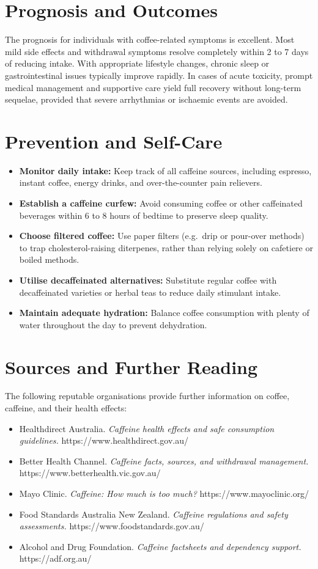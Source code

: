 \section*{Prognosis and Outcomes}
The prognosis for individuals with coffee-related symptoms is excellent. Most mild side effects and withdrawal symptoms resolve completely within 2 to 7 days of reducing intake. With appropriate lifestyle changes, chronic sleep or gastrointestinal issues typically improve rapidly. In cases of acute toxicity, prompt medical management and supportive care yield full recovery without long-term sequelae, provided that severe arrhythmias or ischaemic events are avoided.

\section*{Prevention and Self-Care}
\begin{itemize}
    \item \textbf{Monitor daily intake:} Keep track of all caffeine sources, including espresso, instant coffee, energy drinks, and over-the-counter pain relievers.
    \item \textbf{Establish a caffeine curfew:} Avoid consuming coffee or other caffeinated beverages within 6 to 8 hours of bedtime to preserve sleep quality.
    \item \textbf{Choose filtered coffee:} Use paper filters (e.g.\ drip or pour-over methods) to trap cholesterol-raising diterpenes, rather than relying solely on cafetiere or boiled methods.
    \item \textbf{Utilise decaffeinated alternatives:} Substitute regular coffee with decaffeinated varieties or herbal teas to reduce daily stimulant intake.
    \item \textbf{Maintain adequate hydration:} Balance coffee consumption with plenty of water throughout the day to prevent dehydration.
\end{itemize}

\section*{Sources and Further Reading}
The following reputable organisations provide further information on coffee, caffeine, and their health effects:
\begin{itemize}
    \item Healthdirect Australia. \textit{Caffeine health effects and safe consumption guidelines.} https://www.healthdirect.gov.au/
    \item Better Health Channel. \textit{Caffeine facts, sources, and withdrawal management.} https://www.betterhealth.vic.gov.au/
    \item Mayo Clinic. \textit{Caffeine: How much is too much?} https://www.mayoclinic.org/
    \item Food Standards Australia New Zealand. \textit{Caffeine regulations and safety assessments.} https://www.foodstandards.gov.au/
    \item Alcohol and Drug Foundation. \textit{Caffeine factsheets and dependency support.} https://adf.org.au/
\end{itemize}
